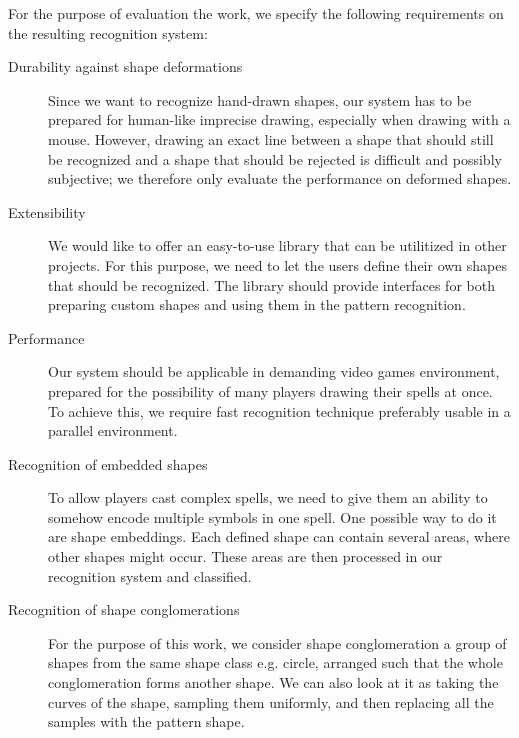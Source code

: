 For the purpose of evaluation the work, we specify the following requirements on the resulting recognition system:
\begin{description}

\item [Durability against shape deformations]
Since we want to recognize hand-drawn shapes, our system has to be prepared for human-like imprecise drawing, especially when drawing with a mouse. However, drawing an exact line between a shape that should still be recognized and a shape that should be rejected is difficult and possibly subjective; we therefore only evaluate the performance on deformed shapes.

\item [Extensibility]
We would like to offer an easy-to-use library that can be utilitized in other projects. For this purpose, we need to let the users define their own shapes that should be recognized. The library should provide interfaces for both preparing custom shapes and using them in the pattern recognition.

\item [Performance]
Our system should be applicable in demanding video games environment, prepared for the possibility of many players drawing their spells at once. To achieve this, we require fast recognition technique preferably usable in a parallel environment.

\item [Recognition of embedded shapes]
To allow players cast complex spells, we need to give them an ability to somehow encode multiple symbols in one spell. One possible way to do it are shape embeddings. Each defined shape can contain several areas, where other shapes might occur. These areas are then processed in our recognition system and classified.

\item [Recognition of shape conglomerations]
For the purpose of this work, we consider shape conglomeration a group of shapes from the same shape class e.g. circle, arranged such that the whole conglomeration forms another shape. We can also look at it as taking the curves of the shape, sampling them uniformly, and then replacing all the samples with the pattern shape.
\end{description}

